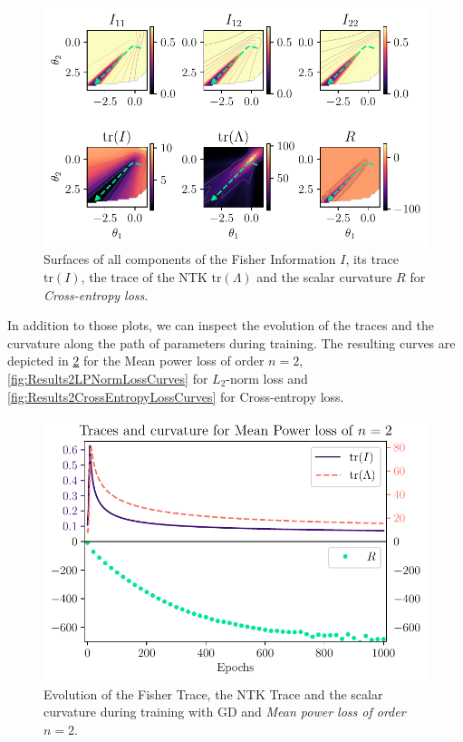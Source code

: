 \begin{figure}
	\centering
	\includegraphics{Experiment2/plots/CrossEntropyLoss_tracecomparison.pdf}
	\caption{Surfaces of all components of the Fisher Information $I$, its trace $\mathrm{tr}(I)$, the trace of the NTK $\mathrm{tr}(\Lambda)$ and the scalar curvature $R$ for \emph{Cross-entropy loss}.}
	\label{fig:Results2CrossEntropyLoss}
\end{figure}


In addition to those plots, we can inspect the evolution of the traces and the curvature along the path of parameters during training. The resulting curves are depicted in \cref{fig:Results2MeanPowerLossCurves} for the Mean power loss of order $n=2$, \cref{fig:Results2LPNormLossCurves} for $L_2$-norm loss and \cref{fig:Results2CrossEntropyLossCurves} for Cross-entropy loss.

\begin{figure}
	\centering
	\includegraphics{Experiment2/plots/MeanPowerLoss2_Curves.pdf}
	\caption{Evolution of the Fisher Trace, the NTK Trace and the scalar curvature during training with GD and \emph{Mean power loss of order $n=2$}.}
	\label{fig:Results2MeanPowerLossCurves}
\end{figure}

